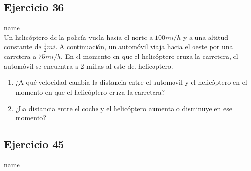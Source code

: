 \documentclass[12pt]{article}
\begin{document}
\subsection{Ejercicio 36} name \\

Un helicóptero de la policía vuela hacia el norte a $100 mi/h$ y a una altitud constante de $\frac{1}{2} mi$. A continuación, un automóvil viaja hacia el oeste por una carretera a $75 mi/h$. En el momento en que el helicóptero cruza la carretera, el automóvil se encuentra a 2 millas al este del helicóptero.
\begin{enumerate}
\item ¿A qué velocidad cambia la distancia entre el automóvil y el helicóptero en el momento en que el helicóptero cruza la carretera?
\item ¿La distancia entre el coche y el helicóptero aumenta o disminuye en ese momento?
\end{enumerate}

\subsection{Ejercicio 45} name \\
\end{document}
